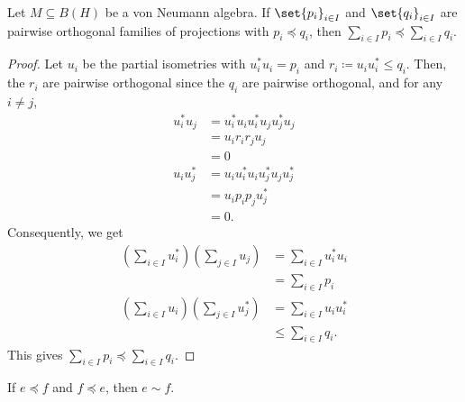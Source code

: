 \documentclass[10pt]{mypackage}
\renewcommand{\coloneq}{\coloneqq}
\begin{document}
\begin{lemma}
  Let $M\subseteq B(H)$ be a von Neumann algebra. If $\set{p_i}_{i\in I}$ and $\set{q_i}_{i\in I}$ are pairwise orthogonal families of projections with $p_i\preceq q_i$, then $\sum_{i\in I}p_i\preceq \sum_{i\in I}q_i$.
\end{lemma}
\begin{proof}
  Let $u_i$ be the partial isometries with $u_i^{\ast}u_i = p_i$ and $r_i\coloneq u_iu_i^{\ast}\leq q_i$. Then, the $r_i$ are pairwise orthogonal since the $q_i$ are pairwise orthogonal, and for any $i\neq j$,
  \begin{align*}
    u_i^{\ast}u_j &= u_i^{\ast}u_iu_i^{\ast}u_ju_j^{\ast}u_j\\
                  &= u_ir_ir_ju_j\\
                  &= 0\\
    u_iu_j^{\ast} &= u_iu_i^{\ast}u_iu_j^{\ast}u_ju_j^{\ast}\\
                  &= u_ip_ip_ju_j^{\ast}\\
                  &= 0.
  \end{align*}
  Consequently, we get
  \begin{align*}
    \left( \sum_{i\in I}u_i^{\ast} \right)\left( \sum_{j\in I}u_j \right) &= \sum_{i\in I}u_i^{\ast}u_i\\
                                                                          &= \sum_{i\in I}p_i\\
    \left( \sum_{i\in I}u_i \right)\left( \sum_{j\in I}u_j^{\ast} \right) &= \sum_{i\in I}u_iu_i^{\ast}\\
                                                                          &\leq \sum_{i\in I}q_i.
  \end{align*}
  This gives $\sum_{i\in I}p_i\preceq \sum_{i\in I}q_i$.
\end{proof}
\begin{theorem}
  If $e\preceq f$ and $f\preceq e$, then $e\sim f$.
\end{theorem}
\end{document}
